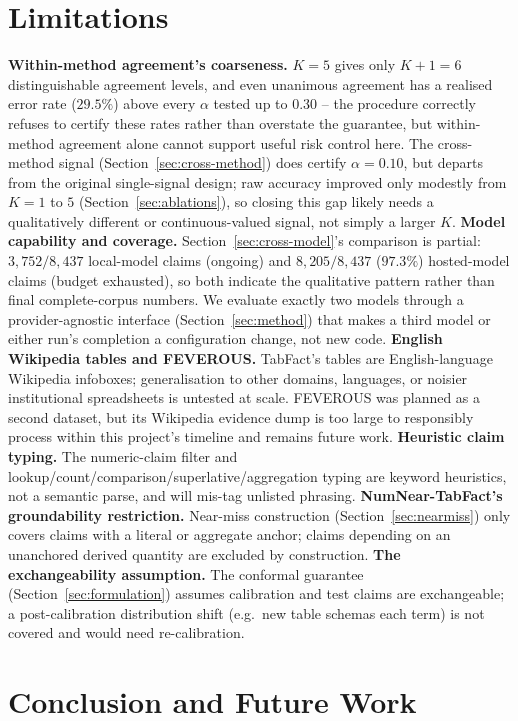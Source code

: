 \documentclass[journal]{IEEEtran}
\begin{document}
\section{Limitations}
\label{sec:limitations}

\textbf{Within-method agreement's coarseness.} $K=5$ gives only $K{+}1=6$
distinguishable agreement levels, and even unanimous agreement has a
realised error rate ($29.5\%$) above every $\alpha$ tested up to $0.30$ --
the procedure correctly refuses to certify these rates rather than overstate
the guarantee, but within-method agreement alone cannot support useful risk
control here. The cross-method signal (Section~\ref{sec:cross-method})
does certify $\alpha=0.10$, but departs from the original single-signal
design; raw accuracy improved only modestly from $K{=}1$ to $5$
(Section~\ref{sec:ablations}), so closing this gap likely needs a
qualitatively different or continuous-valued signal, not simply a larger
$K$.
\textbf{Model capability and coverage.} Section~\ref{sec:cross-model}'s
comparison is partial: $3{,}752/8{,}437$ local-model claims (ongoing) and
$8{,}205/8{,}437$ ($97.3\%$) hosted-model claims (budget exhausted), so both
indicate the qualitative pattern rather than final complete-corpus numbers.
We evaluate exactly two models through a provider-agnostic interface
(Section~\ref{sec:method}) that makes a third model or either run's
completion a configuration change, not new code.
\textbf{English Wikipedia tables and FEVEROUS.} TabFact's tables are
English-language Wikipedia infoboxes; generalisation to other domains,
languages, or noisier institutional spreadsheets is untested at scale.
FEVEROUS was planned as a second dataset, but its Wikipedia evidence dump is
too large to responsibly process within this project's timeline and remains
future work. \textbf{Heuristic claim typing.} The numeric-claim filter and
lookup/count/comparison/superlative/aggregation typing are keyword
heuristics, not a semantic parse, and will mis-tag unlisted phrasing.
\textbf{NumNear-TabFact's groundability restriction.} Near-miss construction
(Section~\ref{sec:nearmiss}) only covers claims with a literal or aggregate
anchor; claims depending on an unanchored derived quantity are excluded by
construction. \textbf{The exchangeability assumption.} The conformal
guarantee (Section~\ref{sec:formulation}) assumes calibration and test
claims are exchangeable; a post-calibration distribution shift (e.g.\ new
table schemas each term) is not covered and would need re-calibration.

\section{Conclusion and Future Work}
\label{sec:conclusion}
\end{document}
